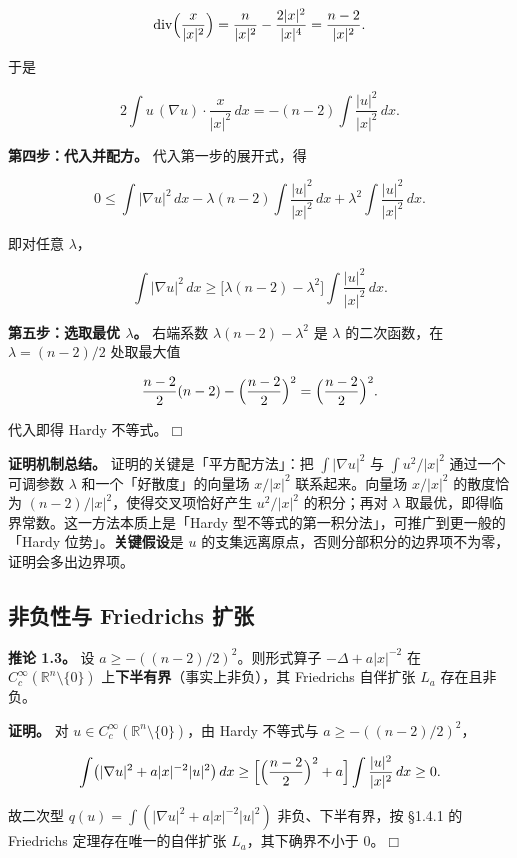 \documentclass[a4paper,11pt,openany]{ctexbook}
\numberwithin{equation}{chapter}
\numberwithin{figure}{chapter}
\numberwithin{table}{chapter}
\begin{document}
$$\mathrm{div}\Bigl(\frac{x}{|x|^2}\Bigr)
= \frac{n}{|x|^2}-\frac{2|x|^2}{|x|^4}
= \frac{n-2}{|x|^2}.$$

于是

$$2\int u\,(\nabla u)\cdot\frac{x}{|x|^2}\,dx = -(n-2)\int\frac{|u|^2}{|x|^2}\,dx .$$

\textbf{第四步：代入并配方。} 代入第一步的展开式，得

$$0\le \int|\nabla u|^2\,dx - \lambda(n-2)\int\frac{|u|^2}{|x|^2}\,dx + \lambda^2\int\frac{|u|^2}{|x|^2}\,dx .$$

即对任意 $\lambda$，

$$\int|\nabla u|^2\,dx \ge \bigl[\lambda(n-2)-\lambda^2\bigr]\int\frac{|u|^2}{|x|^2}\,dx .$$

\textbf{第五步：选取最优 $\lambda$。} 右端系数 $\lambda(n-2)-\lambda^2$ 是 $\lambda$ 的二次函数，在 $\lambda=(n-2)/2$ 处取最大值

$$\frac{n-2}{2}(n-2)-\Bigl(\frac{n-2}{2}\Bigr)^2 = \Bigl(\frac{n-2}{2}\Bigr)^2 .$$

代入即得 Hardy 不等式。$\Box$

\textbf{证明机制总结。} 证明的关键是「平方配方法」：把 $\int|\nabla u|^2$ 与 $\int u^2/|x|^2$ 通过一个可调参数 $\lambda$ 和一个「好散度」的向量场 $x/|x|^2$ 联系起来。向量场 $x/|x|^2$ 的散度恰为 $(n-2)/|x|^2$，使得交叉项恰好产生 $u^2/|x|^2$ 的积分；再对 $\lambda$ 取最优，即得临界常数。这一方法本质上是「Hardy 型不等式的第一积分法」，可推广到更一般的「Hardy 位势」。\textbf{关键假设}是 $u$ 的支集远离原点，否则分部积分的边界项不为零，证明会多出边界项。

\subsection{非负性与 Friedrichs 扩张}

\textbf{推论 1.3。} 设 $a\ge-((n-2)/2)^2$。则形式算子 $-\Delta+a|x|^{-2}$ 在 $C_c^\infty(\mathbb R^n\setminus\{0\})$ 上\textbf{下半有界}（事实上非负），其 Friedrichs 自伴扩张 $L_a$ 存在且非负。

\textbf{证明。} 对 $u\in C_c^\infty(\mathbb R^n\setminus\{0\})$，由 Hardy 不等式与 $a\ge-((n-2)/2)^2$，

$$\int \bigl(|\nabla u|^2 + a|x|^{-2}|u|^2\bigr)\,dx
\ge \Bigl[\Bigl(\frac{n-2}{2}\Bigr)^2+a\Bigr]\int\frac{|u|^2}{|x|^2}\,dx \ge 0 .$$

故二次型 $q(u)=\int(|\nabla u|^2+a|x|^{-2}|u|^2)$ 非负、下半有界，按 §1.4.1 的 Friedrichs 定理存在唯一的自伴扩张 $L_a$，其下确界不小于 $0$。$\Box$
\end{document}
